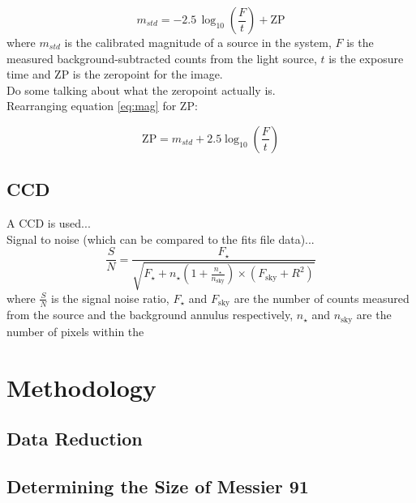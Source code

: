 \documentclass[%
reprint,
amsmath,amssymb,
aps,
]{revtex4-2}
\begin{document}
			\begin{equation}
				m_{std} = -2.5 \, \log_{10}\left(\frac{F}{t}\right) + \text{ZP}
				\label{eq:mag}
			\end{equation} where $m_{std}$ is the calibrated magnitude of a source in the system, $F$ is the measured background-subtracted counts from the light source, $t$ is the exposure time and $\text{ZP}$ is the zeropoint for the image.\\
		
			Do some talking about what the zeropoint actually is.\\
			
			Rearranging equation \ref{eq:mag} for $\text{ZP}$:
			
			\begin{equation}
				\text{ZP} = m_{std} + 2.5 \log_{10}\left(\frac{F}{t}\right)
				\label{eq:zeropoint}
			\end{equation}
		
		\subsection{CCD}
		
			A CCD is used...\\
			
			Signal to noise (which can be compared to the fits file data)...\\
			
			\begin{equation}
				\frac{S}{N} = \frac{F_\star}{\sqrt{F_\star + n_\star \left( 1 + \frac{n_\star}{n_\text{sky}}\right) \times \left(F_\text{sky} + R^2\right)}}
			\end{equation}where $\frac{S}{N}$ is the signal noise ratio, $F_\star$ and $F_\text{sky}$ are the number of counts measured from the source and the background annulus respectively, $n_\star$ and $n_\text{sky}$ are the number of pixels within the  
	 
	\section{Methodology}
	
		\subsection{Data Reduction}
		
		\subsection{Determining the Size of Messier 91}
			
\end{document}
